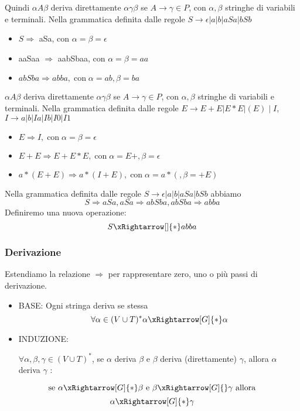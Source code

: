 Quindi $\alpha A \beta$ deriva direttamente $\alpha \gamma \beta$ se $A \rightarrow \gamma \in P$, con $\alpha, \beta$ stringhe di variabili e terminali.
Nella grammatica definita dalle regole $S \rightarrow \epsilon|a| b|a S a| b S b$
\begin{itemize}
    \item $S \Rightarrow$ aSa, con $\alpha=\beta=\epsilon$
    \item aaSaa $\Rightarrow$ aabSbaa, con $\alpha=\beta=a a$
    \item $a b S b a \Rightarrow a b b a, \operatorname{con} \alpha=a b, \beta=b a$
\end{itemize}
$\alpha A \beta$ deriva direttamente $\alpha \gamma \beta$ se $A \rightarrow \gamma \in P$, con $\alpha, \beta$ stringhe di variabili e terminali.
Nella grammatica definita dalle regole $E \rightarrow E+E|E * E|(E) \mid I$,
$I\rightarrow a| b|Ia| Ib| I0 | I1$
\begin{itemize}
    \item $ E \Rightarrow I, \operatorname{con} \alpha=\beta=\epsilon$
    \item $ E+E \Rightarrow E+E * E, \operatorname{con} \alpha=E+, \beta=\epsilon$
    \item $ a *(E+E) \Rightarrow a *(I+E), \operatorname{con} \alpha=a *(, \beta=+E)$
\end{itemize}

Nella grammatica definita dalle regole $S \rightarrow \epsilon|a| b|a S a| b S b$ abbiamo
$$
S \Rightarrow a S a, a S a \Rightarrow a b S b a, a b S b a \Rightarrow a b b a
$$
Definiremo una nuova operazione:
$$
S \xRightarrow[]{*} a b b a
$$

\subsubsection{Derivazione}
Estendiamo la relazione $\Rightarrow$ per rappresentare zero, uno o più passi di derivazione.
\begin{itemize}
\item BASE: Ogni stringa deriva se stessa
$$
\forall \alpha \in(V \cup T)^{*} \alpha \xRightarrow[G]{*} \alpha
$$
\item INDUZIONE:

$\forall \alpha, \beta, \gamma \in(V \cup T)^{*}$, se $\alpha$ deriva $\beta$ e $\beta$ deriva (direttamente) $\gamma$, allora $\alpha$ deriva $\gamma$ :
\end{itemize}

$$
\text { se } \alpha  \xRightarrow[G]{*} \beta \text { e } \beta  \xRightarrow[G]{} \gamma \text { allora } 
$$
$$
\alpha  \xRightarrow[G]{*} \gamma
$$
\vspace{5mm}


